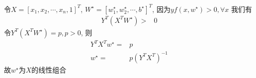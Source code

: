 \documentclass[../main.tex]{subfiles}
\begin{document}
令$X = [x_1, x_2, \cdots, x_n, 1]^T$,
$W^\star = [w_1^\star, w_2^\star, \cdots, b^\star]^T$,
因为$yf(x,w^\star) > 0, \forall x$
我们有
\begin{align*}
Y^T(X^T W^\star) > & 0
\end{align*}
令$Y^T(X^T W^\star) = p, p > 0$,
则
\begin{align*}
Y^T X^T w^\star = & p \\
w^\star = & p(Y^T X^T)^{-1}
\end{align*}
故$w^\star$为$X$的线性组合
\end{document}
